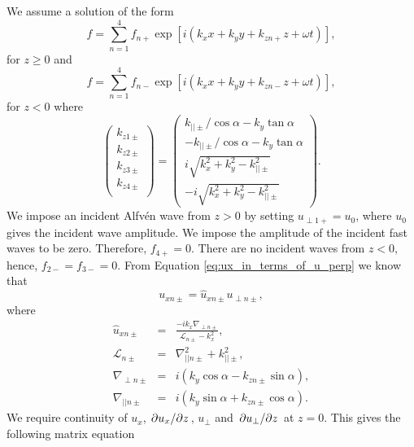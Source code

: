 \documentclass[linenumbers]{aastex63}
\begin{document}
We assume a solution of the form
\begin{equation}
    f = \sum_{n=1}^4 f_{n+}\exp[i(k_x x + k_y y + k_{zn+} z + \omega t)],
\end{equation}
for $z\ge 0$ and
\begin{equation}
    f = \sum_{n=1}^4 f_{n-}\exp[i(k_x x + k_y y + k_{zn-} z + \omega t)],
\end{equation}
for $z<0$ where
\begin{equation}
\begin{pmatrix}
k_{z1\pm} \\
k_{z2\pm} \\
k_{z3\pm} \\
k_{z4\pm} \\
\end{pmatrix}
=
\begin{pmatrix}
 k_{||\pm}/\cos\alpha - k_y\tan\alpha \\
-k_{||\pm}/\cos\alpha - k_y\tan\alpha \\
 i\sqrt{k_x^2+k_y^2 - k_{||\pm}^2} \\
-i\sqrt{k_x^2+k_y^2 - k_{||\pm}^2}
\end{pmatrix}.
\end{equation}
We impose an incident Alfv\'en wave from $z>0$ by setting $u_{\perp1+}=u_0$, where $u_0$ gives the incident wave amplitude. We impose the amplitude of the incident fast waves to be zero. Therefore, $f_{4+}=0$. There are no incident waves from $z<0$, hence, $f_{2-}=f_{3-}=0$.  From Equation \eqref{eq:ux_in_terms_of_u_perp} we know that
\begin{equation}
    \label{eq:ux_pm_u_perp_pm}
    u_{x n\pm} = \hat{u}_{x n\pm}u_{\perp n\pm},
\end{equation}
where
\begin{eqnarray}
    \label{eq:uxnpm}
    \hat{u}_{x n\pm} & = & \frac{-ik_x\nabla_{\perp n\pm}}{\mathcal{L}_{n\pm}-k_x^2}, \\
    \mathcal{L}_{n\pm} & = &\nabla_{||n\pm}^2+k_{||\pm}^2, \\
    \nabla_{\perp n\pm} & = & i(k_y\cos\alpha - k_{zn\pm}\sin\alpha), \\
    \nabla_{||n\pm} & = & i(k_y \sin\alpha + k_{zn\pm}\cos\alpha).
\end{eqnarray}
We require continuity of $u_x$, $\pdv*{u_x}{z}$, $u_\perp$ and $\pdv*{u_\perp}{z}$ at $z=0$. This gives the following matrix equation
\end{document}
